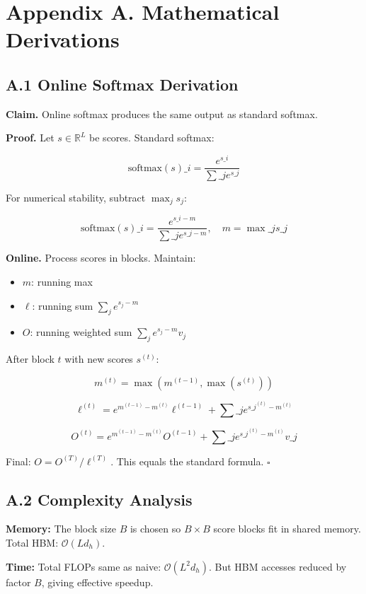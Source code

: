 \section{Appendix A. Mathematical Derivations}

\subsection{A.1 Online Softmax Derivation}

\textbf{Claim.} Online softmax produces the same output as standard softmax.

\textbf{Proof.} Let $s \in \mathbb{R}^L$ be scores. Standard softmax:

\[
\text{softmax}(s)\_i = \frac{e^{s\_i}}{\sum\_j e^{s\_j}}
\tag{A.1}
\]

For numerical stability, subtract $\max_j s_j$:

\[
\text{softmax}(s)\_i = \frac{e^{s\_i - m}}{\sum\_j e^{s\_j - m}}, \quad m = \max\_j s\_j
\tag{A.2}
\]

\textbf{Online.} Process scores in blocks. Maintain:
\begin{itemize}
\item $m$: running max
\item $\ell$: running sum $\sum_j e^{s_j - m}$
\item $O$: running weighted sum $\sum_j e^{s_j - m} v_j$

\end{itemize}
After block $t$ with new scores $s^{(t)}$:

\[
m^{(t)} = \max(m^{(t-1)}, \max(s^{(t)}))
\tag{A.3}
\]

\[
\ell^{(t)} = e^{m^{(t-1)} - m^{(t)}} \ell^{(t-1)} + \sum\_j e^{s\_j^{(t)} - m^{(t)}}
\tag{A.4}
\]

\[
O^{(t)} = e^{m^{(t-1)} - m^{(t)}} O^{(t-1)} + \sum\_j e^{s\_j^{(t)} - m^{(t)}} v\_j
\tag{A.5}
\]

Final: $O = O^{(T)} / \ell^{(T)}$. This equals the standard formula. $\square$

\subsection{A.2 Complexity Analysis}

\textbf{Memory:} The block size $B$ is chosen so $B \times B$ score blocks fit 
in shared memory. Total HBM: $\mathcal{O}(L d_h)$.

\textbf{Time:} Total FLOPs same as naive: $\mathcal{O}(L^2 d_h)$. But HBM 
accesses reduced by factor $B$, giving effective speedup.

